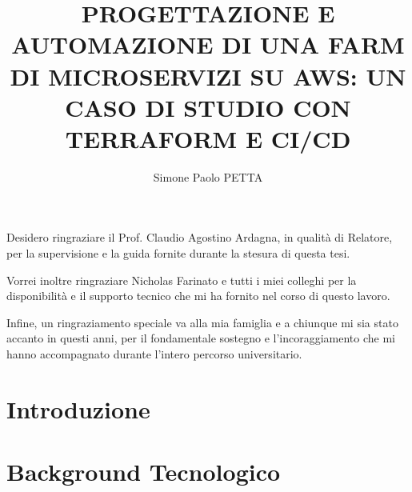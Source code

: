 \title{PROGETTAZIONE E AUTOMAZIONE DI UNA FARM DI MICROSERVIZI SU AWS: UN CASO DI STUDIO CON TERRAFORM E CI/CD}
\author{Simone Paolo PETTA}
%
% 
%
\beforepreface
%
%
Desidero ringraziare il Prof. Claudio Agostino Ardagna, in qualità di Relatore, per la supervisione e la guida fornite durante la stesura di questa tesi.

Vorrei inoltre ringraziare Nicholas Farinato e tutti i miei colleghi per la disponibilità e il supporto tecnico che mi ha fornito nel corso di questo lavoro.

Infine, un ringraziamento speciale va alla mia famiglia e a chiunque mi sia stato accanto in questi anni, per il fondamentale sostegno e l'incoraggiamento che mi hanno accompagnato durante l’intero percorso universitario.

\afterpreface
% 
% 
\chapter{Introduzione}
\label{caph:introduzione}
%
%


\chapter{Background Tecnologico}
\label{chap:background}


